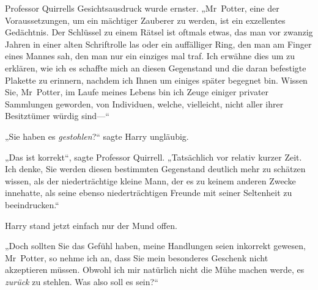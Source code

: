 Professor Quirrells Gesichtsausdruck wurde ernster. „Mr~Potter, eine der Voraussetzungen, um ein mächtiger Zauberer zu werden, ist ein exzellentes Gedächtnis. Der Schlüssel zu einem Rätsel ist oftmals etwas, das man vor zwanzig Jahren in einer alten Schriftrolle las oder ein auffälliger Ring, den man am Finger eines Mannes sah, den man nur ein einziges mal traf. Ich erwähne dies um zu erklären, wie ich es schaffte mich an diesen Gegenstand und die daran befestigte Plakette zu erinnern, nachdem ich Ihnen um einiges später begegnet bin. Wissen Sie, Mr~Potter, im Laufe meines Lebens bin ich Zeuge einiger privater Sammlungen geworden, von Individuen, welche, vielleicht, nicht aller ihrer Besitztümer würdig sind—“

„Sie haben es \emph{gestohlen}?“ sagte Harry ungläubig.

„Das ist korrekt“, sagte Professor Quirrell. „Tatsächlich vor relativ kurzer Zeit. Ich denke, Sie werden diesen bestimmten Gegenstand deutlich mehr zu schätzen wissen, als der niederträchtige kleine Mann, der es zu keinem anderen Zwecke innehatte, als seine ebenso niederträchtigen Freunde mit seiner Seltenheit zu beeindrucken.“

Harry stand jetzt einfach nur der Mund offen.

„Doch sollten Sie das Gefühl haben, meine Handlungen seien inkorrekt gewesen, Mr~Potter, so nehme ich an, dass Sie mein besonderes Geschenk nicht akzeptieren müssen. Obwohl ich mir natürlich nicht die Mühe machen werde, es \emph{zurück} zu stehlen. Was also soll es sein?“

